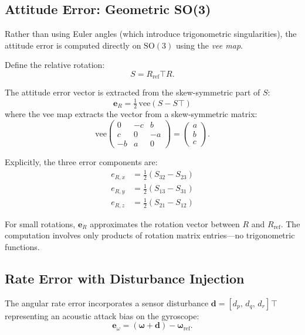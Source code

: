 \documentclass[11pt]{article}
\newcommand{\SO}{\mathrm{SO}(3)}
\newcommand{\vee}{\mathrm{vee}}
\newcommand{\T}{\!\top}
\begin{document}
\subsection{Attitude Error: Geometric SO(3)}

Rather than using Euler angles (which introduce trigonometric
singularities), the attitude error is computed directly on $\SO$ using
the \emph{vee map}.

Define the relative rotation:
\begin{equation}
  S = R_\mathrm{ref}^\T R.
\end{equation}

The attitude error vector is extracted from the skew-symmetric part of
$S$:
\begin{equation}
  \bm{e}_R = \tfrac{1}{2}\,\vee(S - S^\T)
\end{equation}
where the vee map extracts the vector from a skew-symmetric matrix:
\begin{equation}
  \vee\!\begin{pmatrix}
    0 & -c & b \\ c & 0 & -a \\ -b & a & 0
  \end{pmatrix}
  = \begin{pmatrix} a \\ b \\ c \end{pmatrix}.
\end{equation}

Explicitly, the three error components are:
\begin{align}
  e_{R,x} &= \tfrac{1}{2}(S_{32} - S_{23}) \\
  e_{R,y} &= \tfrac{1}{2}(S_{13} - S_{31}) \\
  e_{R,z} &= \tfrac{1}{2}(S_{21} - S_{12})
\end{align}

For small rotations, $\bm{e}_R$ approximates the rotation vector between
$R$ and $R_\mathrm{ref}$. The computation involves only products of
rotation matrix entries---no trigonometric functions.

\subsection{Rate Error with Disturbance Injection}

The angular rate error incorporates a sensor disturbance
$\bm{d} = [d_p,\, d_q,\, d_r]^\T$ representing an acoustic attack bias
on the gyroscope:
\begin{equation}
  \bm{e}_\omega = (\bm{\omega} + \bm{d}) - \bm{\omega}_\mathrm{ref}.
\end{equation}
\end{document}
